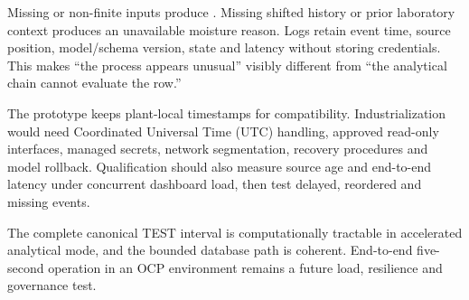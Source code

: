 Missing or non-finite inputs produce . Missing shifted history or prior laboratory context produces an unavailable moisture reason. Logs retain event time, source position, model/schema version, state and latency without storing credentials. This makes ``the process appears unusual'' visibly different from ``the analytical chain cannot evaluate the row.''

The prototype keeps plant-local timestamps for compatibility. Industrialization would need Coordinated Universal Time (UTC) handling, approved read-only interfaces, managed secrets, network segmentation, recovery procedures and model rollback. Qualification should also measure source age and end-to-end latency under concurrent dashboard load, then test delayed, reordered and missing events.

\begin{engineeringbox}
The complete canonical TEST interval is computationally tractable in accelerated analytical mode, and the bounded database path is coherent. End-to-end five-second operation in an OCP environment remains a future load, resilience and governance test.
\end{engineeringbox}
